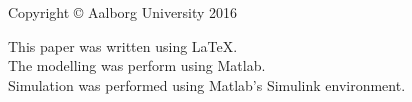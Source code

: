 \thispagestyle{empty}
{\small
\strut\vfill %
\noindent Copyright \copyright{} Aalborg University 2016\par
\vspace{0.2cm}
\noindent This paper was written using LaTeX. \\
The modelling was perform using Matlab. \\
Simulation was performed using Matlab's Simulink environment.
}
\clearpage

